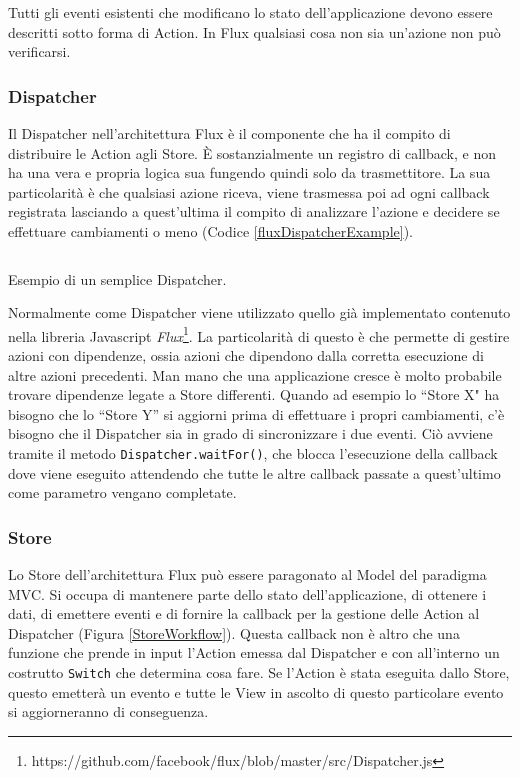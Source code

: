 Tutti gli eventi esistenti che modificano lo stato dell'applicazione devono essere descritti sotto forma di Action. In Flux qualsiasi cosa non sia un'azione non può verificarsi.

\subsubsection*{Dispatcher}
Il Dispatcher nell'architettura Flux è il componente che ha il compito di distribuire le Action agli Store. È sostanzialmente un registro di callback, e non ha una vera e propria logica sua fungendo quindi solo da trasmettitore. La sua particolarità è che qualsiasi azione riceva, viene trasmessa poi ad ogni callback registrata lasciando a quest'ultima il compito di analizzare l'azione e decidere se effettuare cambiamenti o meno (Codice \ref{fluxDispatcherExample}).

\begin{listing}[ht]
\inputminted{javascript}{sources/fluxDispatcherExample.js}
\caption{Esempio di un semplice Dispatcher.} 
\label{fluxDispatcherExample} 
\end{listing} 

Normalmente come Dispatcher viene utilizzato quello già implementato contenuto nella libreria Javascript \textit{Flux}\footnote{https://github.com/facebook/flux/blob/master/src/Dispatcher.js}. La particolarità di questo è che permette di gestire azioni con dipendenze, ossia azioni che dipendono dalla corretta esecuzione di altre azioni precedenti. Man mano che una applicazione cresce è molto probabile trovare dipendenze legate a Store differenti. Quando ad esempio lo “Store X" ha bisogno che lo “Store Y” si aggiorni prima di effettuare i propri cambiamenti, c'è bisogno che il Dispatcher sia in grado di sincronizzare i due eventi. Ciò avviene tramite il metodo \texttt{Dispatcher.waitFor()}, che blocca l'esecuzione della callback dove viene eseguito attendendo che tutte le altre callback passate a quest'ultimo come parametro vengano completate.

\subsubsection*{Store}
Lo Store dell'architettura Flux può essere paragonato al Model del paradigma MVC. Si occupa di mantenere parte dello stato dell'applicazione, di ottenere i dati, di emettere eventi e di fornire la callback per la gestione delle Action al Dispatcher (Figura \ref{StoreWorkflow}). Questa callback non è altro che una funzione che prende in input l'Action emessa dal Dispatcher e con all'interno un costrutto \texttt{Switch} che determina cosa fare. Se l'Action è stata eseguita dallo Store, questo emetterà un evento e tutte le View in ascolto di questo particolare evento si aggiorneranno di conseguenza.

